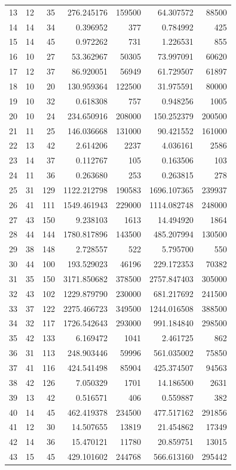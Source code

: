 \documentclass{article}
\begin{document}
\begin{landscape}
\begin{longtable}{rrrrrrr}
13 & 12 & 35 & 276.245176 & 159500 & 64.307572 & 88500 \\
14 & 14 & 34 & 0.396952 & 377 & 0.784992 & 425 \\
15 & 14 & 45 & 0.972262 & 731 & 1.226531 & 855 \\
16 & 10 & 27 & 53.362967 & 50305 & 73.997091 & 60620 \\
17 & 12 & 37 & 86.920051 & 56949 & 61.729507 & 61897 \\
18 & 10 & 20 & 130.959364 & 122500 & 31.975591 & 80000 \\
19 & 10 & 32 & 0.618308 & 757 & 0.948256 & 1005 \\
20 & 10 & 24 & 234.650916 & 208000 & 150.252379 & 200500 \\
21 & 11 & 25 & 146.036668 & 131000 & 90.421552 & 161000 \\
22 & 13 & 42 & 2.614206 & 2237 & 4.036161 & 2586 \\
23 & 14 & 37 & 0.112767 & 105 & 0.163506 & 103 \\
24 & 11 & 36 & 0.263680 & 253 & 0.263815 & 278 \\
25 & 31 & 129 & 1122.212798 & 190583 & 1696.107365 & 239937 \\
26 & 41 & 111 & 1549.461943 & 229000 & 1114.082748 & 248000 \\
27 & 43 & 150 & 9.238103 & 1613 & 14.494920 & 1864 \\
28 & 44 & 144 & 1780.817896 & 143500 & 485.207994 & 130500 \\
29 & 38 & 148 & 2.728557 & 522 & 5.795700 & 550 \\
30 & 44 & 100 & 193.529023 & 46196 & 229.172353 & 70382 \\
31 & 35 & 150 & 3171.850682 & 378500 & 2757.847403 & 305000 \\
32 & 43 & 102 & 1229.879790 & 230000 & 681.217692 & 241500 \\
33 & 37 & 122 & 2275.466723 & 349500 & 1244.016508 & 388500 \\
34 & 32 & 117 & 1726.542643 & 293000 & 991.184840 & 298500 \\
35 & 42 & 133 & 6.169472 & 1041 & 2.461725 & 862 \\
36 & 31 & 113 & 248.903446 & 59996 & 561.035002 & 75850 \\
37 & 41 & 116 & 424.541498 & 85904 & 425.374507 & 94563 \\
38 & 42 & 126 & 7.050329 & 1701 & 14.186500 & 2631 \\
39 & 13 & 42 & 0.516571 & 406 & 0.559887 & 382 \\
40 & 14 & 45 & 462.419378 & 234500 & 477.517162 & 291856 \\
41 & 12 & 30 & 14.507655 & 13819 & 21.454862 & 17349 \\
42 & 14 & 36 & 15.470121 & 11780 & 20.859751 & 13015 \\
43 & 15 & 45 & 429.101602 & 244768 & 566.613160 & 295442 \\
\end{longtable}


\end{landscape}
\end{document}
